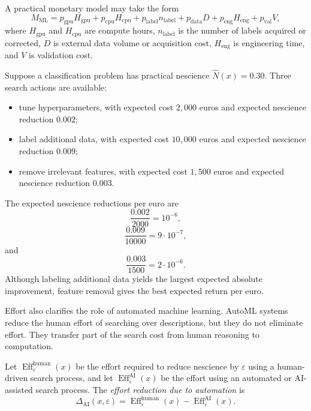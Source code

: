 A practical monetary model may take the form
\[
M_{\mathrm{ML}}
=
p_{\mathrm{gpu}}H_{\mathrm{gpu}}
+
p_{\mathrm{cpu}}H_{\mathrm{cpu}}
+
p_{\mathrm{label}}n_{\mathrm{label}}
+
p_{\mathrm{data}}D
+
p_{\mathrm{eng}}H_{\mathrm{eng}}
+
p_{\mathrm{val}}V,
\]
where \(H_{\mathrm{gpu}}\) and \(H_{\mathrm{cpu}}\) are compute hours, \(n_{\mathrm{label}}\) is the number of labels acquired or corrected, \(D\) is external data volume or acquisition cost, \(H_{\mathrm{eng}}\) is engineering time, and \(V\) is validation cost.

\begin{example}
Suppose a classification problem has practical nescience \(\widehat{N}(x)=0.30\). Three search actions are available:
\begin{itemize}
    \item tune hyperparameters, with expected cost \(2{,}000\) euros and expected nescience reduction \(0.002\);
    \item label additional data, with expected cost \(10{,}000\) euros and expected nescience reduction \(0.009\);
    \item remove irrelevant features, with expected cost \(1{,}500\) euros and expected nescience reduction \(0.003\).
\end{itemize}
The expected nescience reductions per euro are
\[
\frac{0.002}{2000}=10^{-6},
\]
\[
\frac{0.009}{10000}=9\cdot 10^{-7},
\]
and
\[
\frac{0.003}{1500}=2\cdot 10^{-6}.
\]
Although labeling additional data yields the largest expected absolute improvement, feature removal gives the best expected return per euro.
\end{example}

Effort also clarifies the role of automated machine learning. AutoML systems reduce the human effort of searching over descriptions, but they do not eliminate effort. They transfer part of the search cost from human reasoning to computation.

\begin{definition}
Let \(\operatorname{Eff}^{\mathrm{human}}_{\varepsilon}(x)\) be the effort required to reduce nescience by \(\varepsilon\) using a human-driven search process, and let \(\operatorname{Eff}^{\mathrm{AI}}_{\varepsilon}(x)\) be the effort using an automated or AI-assisted search process. The \emph{effort reduction due to automation} is
\[
\Delta_{\mathrm{AI}}(x,\varepsilon)
=
\operatorname{Eff}^{\mathrm{human}}_{\varepsilon}(x)
-
\operatorname{Eff}^{\mathrm{AI}}_{\varepsilon}(x).
\]
\end{definition}

